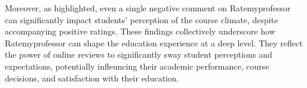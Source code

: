 \documentclass[doc, 12pt, twocolumn]{apa7}
\begin{document}
Moreover, as \textcite{scherr_single_2013} highlighted, even a single negative comment on Ratemyprofessor can significantly impact students' perception of the course climate, despite accompanying positive ratings. These findings collectively underscore how Ratemyprofessor can shape the education experience at a deep level. They reflect the power of online reviews to significantly sway student perceptions and expectations, potentially infleuncing their academic performance, course decisions, and satisfaction with their education. 










\printbibliography
\end{document}

